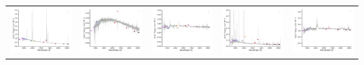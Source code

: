 \begin{center}
\begin{longtable}{l l l l l }
    \includegraphics[width=0.2\linewidth, clip]{Figs/Figs-sdss/spec-2636-54082-0584-STRIPE82-0054-038222.pdf} & \includegraphics[width=0.2\linewidth, clip]{Figs/Figs-sdss/spec-2892-54552-0550-SPLUS-n01s24-037959.pdf} & \includegraphics[width=0.2\linewidth, clip]{Figs/Figs-sdss/spec-3587-55182-0140-STRIPE82-0015-024713.pdf} & \includegraphics[width=0.2\linewidth, clip]{Figs/Figs-sdss/spec-3588-55184-0604-STRIPE82-0016-029684.pdf} & \includegraphics[width=0.2\linewidth, clip]{Figs/Figs-sdss/spec-3589-55186-0260-STRIPE82-0017-024243.pdf} \\

\end{longtable}
\end{center}
